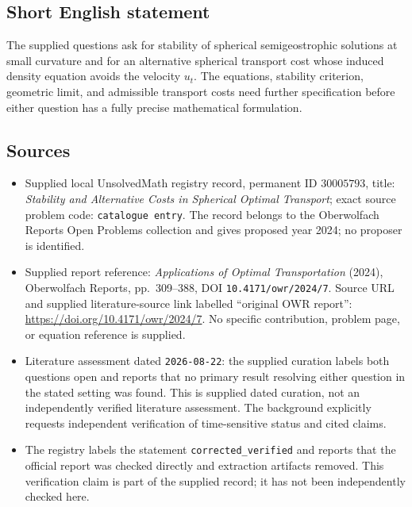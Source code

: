 \documentclass[11pt]{article}
\begin{document}
\subsection{Short English statement}
The supplied questions ask for stability of spherical semigeostrophic solutions at small curvature and for an alternative spherical transport cost whose induced density equation avoids the velocity \(u_t\). The equations, stability criterion, geometric limit, and admissible transport costs need further specification before either question has a fully precise mathematical formulation.
\subsection{Sources}
\begin{itemize}
\item Supplied local UnsolvedMath registry record, permanent ID \(30005793\), title: \emph{Stability and Alternative Costs in Spherical Optimal Transport}; exact source problem code: \texttt{catalogue entry}. The record belongs to the Oberwolfach Reports Open Problems collection and gives proposed year 2024; no proposer is identified.
\item Supplied report reference: \emph{Applications of Optimal Transportation} (2024), Oberwolfach Reports, pp.\ 309--388, DOI \texttt{10.4171/owr/2024/7}. Source URL and supplied literature-source link labelled ``original OWR report'': \url{https://doi.org/10.4171/owr/2024/7}. No specific contribution, problem page, or equation reference is supplied.
\item Literature assessment dated \texttt{2026-08-22}: the supplied curation labels both questions open and reports that no primary result resolving either question in the stated setting was found. This is supplied dated curation, not an independently verified literature assessment. The background explicitly requests independent verification of time-sensitive status and cited claims.
\item The registry labels the statement \texttt{corrected\_verified} and reports that the official report was checked directly and extraction artifacts removed. This verification claim is part of the supplied record; it has not been independently checked here.
\end{itemize}
\end{document}
